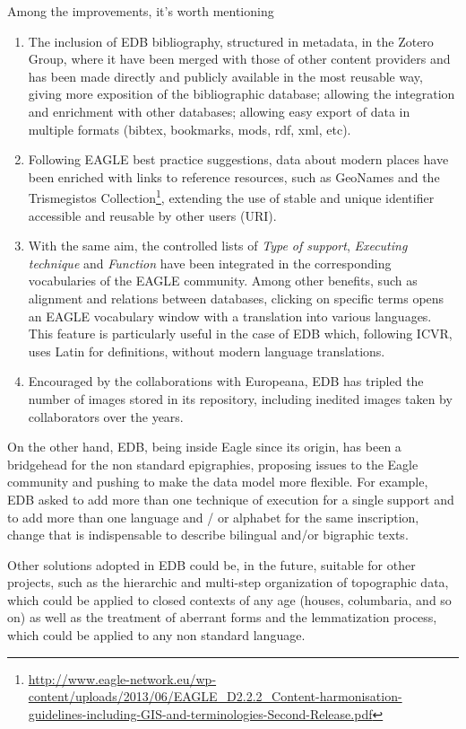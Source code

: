 \documentclass[amsthm,ebook]{saparticle}
\begin{document}
Among the improvements, it’s worth mentioning

\begin{enumerate}
\item The inclusion of EDB bibliography, structured in metadata, in the Zotero Group, where it have been merged with those
of other content providers and has been made directly and publicly available in the most reusable way, giving more
exposition of the bibliographic database; allowing the integration and enrichment with other databases; allowing easy
export of data in multiple formats (bibtex, bookmarks, mods, rdf, xml, etc).

\item Following EAGLE best practice suggestions, data about modern places have been enriched with links to reference
resources, such as GeoNames and the Trismegistos Collection\footnote{
\url{http://www.eagle-network.eu/wp-content/uploads/2013/06/EAGLE\_D2.2.2\_Content-harmonisation-guidelines-including-GIS-and-terminologies-Second-Release.pdf}},
extending the use of stable and unique identifier accessible and reusable by other users (URI).

\item With the same aim, the controlled lists of \emph{Type of support}, \emph{Executing technique} and \emph{Function} have been integrated in
the corresponding vocabularies of the EAGLE community. Among other benefits, such as alignment and relations between
databases, clicking on specific terms opens an EAGLE vocabulary window with a translation into various languages. This
feature is particularly useful in the case of EDB which, following ICVR, uses Latin for definitions, without modern
language translations.

\item Encouraged by the collaborations with Europeana, EDB has tripled the number of images stored in its repository,
including inedited images taken by collaborators over the years. 
\end{enumerate}


On the other hand, EDB, being inside Eagle since its origin, has been a bridgehead for the non standard epigraphies,
proposing issues to the Eagle community and pushing to make the data model more flexible. For example, EDB asked to add
more than one technique of execution for a single support and to add more than one language and / or alphabet for the
same inscription, change that is indispensable to describe bilingual and/or bigraphic texts. 

Other solutions adopted in EDB could be, in the future, suitable for other projects, such as the hierarchic and
multi-step organization of topographic data, which could be applied to closed contexts of any age (houses, columbaria,
and so on) as well as the treatment of aberrant forms and the lemmatization process, which could be applied to any non
standard language. 
\end{document}
